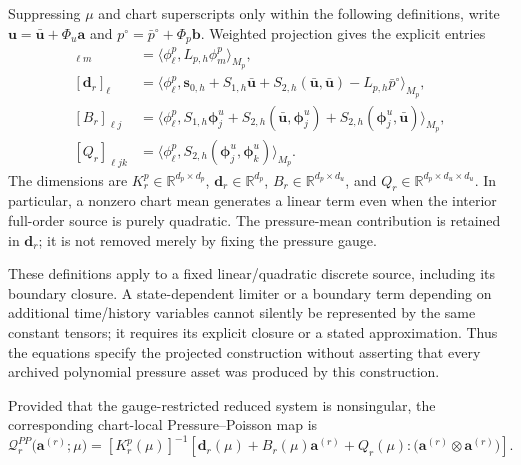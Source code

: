 Suppressing $\mu$ and chart superscripts only within the following definitions, write $\bm u=\bar{\bm u}+\Phi_u\bm a$ and $p^\circ=\bar p^\circ+\Phi_p\bm b$. Weighted projection gives the explicit entries
\begin{align}
 [K_r^p]_{\ell m}
 &=\langle\phi_\ell^p,L_{p,h}\phi_m^p\rangle_{M_p},
 \label{eq:app_ppe_K_definition}\\
 [\bm d_r]_\ell
 &=\big\langle\phi_\ell^p,\bm s_{0,h}+S_{1,h}\bar{\bm u}
   +S_{2,h}(\bar{\bm u},\bar{\bm u})-L_{p,h}\bar p^\circ\big\rangle_{M_p},
 \label{eq:app_ppe_d_definition}\\
 [B_r]_{\ell j}
 &=\big\langle\phi_\ell^p,S_{1,h}\bm\phi_j^u
   +S_{2,h}(\bar{\bm u},\bm\phi_j^u)
   +S_{2,h}(\bm\phi_j^u,\bar{\bm u})\big\rangle_{M_p},
 \label{eq:app_ppe_B_definition}\\
 [Q_r]_{\ell jk}
 &=\langle\phi_\ell^p,S_{2,h}(\bm\phi_j^u,\bm\phi_k^u)\rangle_{M_p}.
 \label{eq:app_ppe_Q_definition}
\end{align}
The dimensions are $K_r^p\in\mathbb R^{d_p\times d_p}$, $\bm d_r\in\mathbb R^{d_p}$, $B_r\in\mathbb R^{d_p\times d_u}$, and $Q_r\in\mathbb R^{d_p\times d_u\times d_u}$. In particular, a nonzero chart mean generates a linear term even when the interior full-order source is purely quadratic. The pressure-mean contribution is retained in $\bm d_r$; it is not removed merely by fixing the pressure gauge.

These definitions apply to a fixed linear/quadratic discrete source, including its boundary closure. A state-dependent limiter or a boundary term depending on additional time/history variables cannot silently be represented by the same constant tensors; it requires its explicit closure or a stated approximation. Thus the equations specify the projected construction without asserting that every archived polynomial pressure asset was produced by this construction.

Provided that the gauge-restricted reduced system is nonsingular, the corresponding chart-local Pressure--Poisson map is
\begin{equation}
    \mathcal Q_r^{PP}
    \bigl(
        \bm a^{(r)};
        \mu
    \bigr)
    =
    [K_r^p(\mu)]^{-1}
    \left[
        \bm d_r(\mu)
        +
        B_r(\mu)\bm a^{(r)}
        +
        Q_r(\mu):
        \bigl(
            \bm a^{(r)}\otimes\bm a^{(r)}
        \bigr)
    \right].
    \label{eq:app_pressure_poisson_map}
\end{equation}

